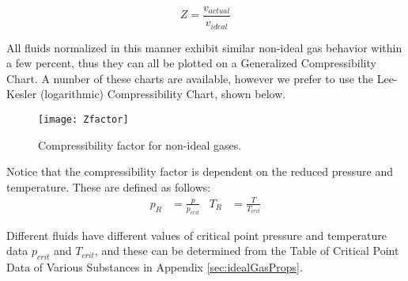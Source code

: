 \begin{equation} \label{eq:ch2_Zdef}
  Z = \frac{v_{actual}}{v_{ideal}}
\end{equation}

All fluids normalized in this manner exhibit similar non-ideal gas behavior within a few percent, thus they can all be plotted on a Generalized Compressibility Chart. A number of these charts are available, however we prefer to use the Lee-Kesler (logarithmic) Compressibility Chart, shown below.


\begin{figure}[H]
\centering
\texttt{[image: Zfactor]}
\caption{Compressibility factor for non-ideal gases.}
\label{fig:ch2_Zfactor}
\end{figure}

Notice that the compressibility factor is dependent on the reduced pressure and temperature.  These are defined as follows:
\begin{align}
  p_R &= \frac{p}{p_{crit}} &   T_R &= \frac{T}{T_{crit}}
\end{align}

Different fluids have different values of critical point pressure and temperature data $p_{crit}$ and $T_{crit}$, and these can be determined from the Table of Critical Point Data of Various Substances in Appendix \ref{sec:idealGasProps}.

